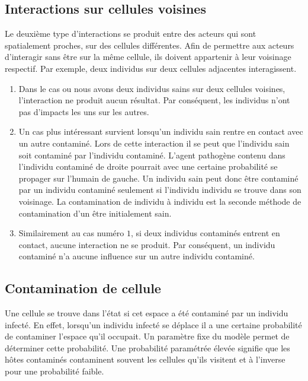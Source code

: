 \subsection{Interactions sur cellules voisines}

Le deuxième type d'interactions se produit entre des acteurs qui sont spatialement proches, sur des cellules différentes. Afin de permettre aux acteurs d'interagir sans être sur la même cellule, ils doivent appartenir à leur voisinage respectif. Par exemple, deux individus sur deux cellules adjacentes interagissent.

\begin{enumerate}
	\item Dans le cas ou nous avons deux individus sains sur deux cellules voisines, l'interaction ne produit aucun résultat. Par conséquent, les individus n'ont pas d’impacts les uns sur les autres.
	\item Un cas plus intéressant survient lorsqu'un individu sain rentre en contact avec un autre contaminé. Lors de cette interaction il se peut que l'individu sain soit contaminé par l'individu contaminé. L'agent pathogène contenu dans l'individu contaminé de droite pourrait avec une certaine probabilité se propager sur l'humain de gauche. Un individu sain peut donc être contaminé par un individu contaminé seulement si l'individu individu se trouve dans son voisinage. La contamination de individu à individu est la seconde méthode de contamination d'un être initialement sain.
	\item Similairement au cas numéro $1$, si deux individus contaminés entrent en contact, aucune interaction ne se produit. Par conséquent, un individu contaminé n'a aucune influence sur un autre individu contaminé.
\end{enumerate}

\subsection{Contamination de cellule}

Une cellule se trouve dans l'état si cet espace a été contaminé par un individu infecté. En effet, lorsqu’un individu infecté se déplace il a une certaine probabilité de contaminer l'espace qu'il occupait. Un paramètre fixe du modèle permet de déterminer cette probabilité. Une probabilité paramétrée élevée signifie que les hôtes contaminés contaminent souvent les cellules qu'ils visitent et à l'inverse pour une probabilité faible.\\

